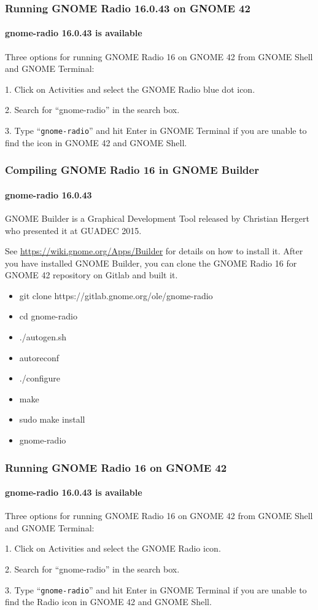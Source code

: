 \documentclass[aspectratio=43]{beamer}
\begin{document}
\begin{frame}
\frametitle{Running GNOME Radio 16.0.43 on GNOME 42}
\framesubtitle{gnome-radio 16.0.43 is available}

Three options for running GNOME Radio 16 on GNOME 42 from GNOME Shell and GNOME Terminal:

1. Click on Activities and select the GNOME Radio blue dot icon.

2. Search for ``gnome-radio'' in the search box.

3. Type ``\texttt{gnome-radio}'' and hit Enter in GNOME Terminal if you are unable to find the icon in GNOME 42 and GNOME Shell.

\end{frame}

\begin{frame}
\frametitle{Compiling GNOME Radio 16 in GNOME Builder}
\framesubtitle{gnome-radio 16.0.43}

GNOME Builder is a Graphical Development Tool released by Christian
Hergert who presented it at GUADEC 2015.

See \url{https://wiki.gnome.org/Apps/Builder} for details on how to
install it.  After you have installed GNOME Builder, you can clone
the GNOME Radio 16 for GNOME 42 repository on Gitlab and built it.

\begin{itemize}
        \item git clone https://gitlab.gnome.org/ole/gnome-radio
        \item cd gnome-radio
        \item ./autogen.sh
        \item autoreconf
        \item ./configure
        \item make
        \item sudo make install
        \item gnome-radio
\end{itemize}

\end{frame}

\begin{frame}
\frametitle{Running GNOME Radio 16 on GNOME 42}
\framesubtitle{gnome-radio 16.0.43 is available}

Three options for running GNOME Radio 16 on GNOME 42 from GNOME Shell and GNOME Terminal:

1. Click on Activities and select the GNOME Radio icon.

2. Search for ``gnome-radio'' in the search box.

3. Type ``\texttt{gnome-radio}'' and hit Enter in GNOME Terminal if you are unable to find the Radio icon in GNOME 42 and GNOME Shell.

\end{frame}
\end{document}
